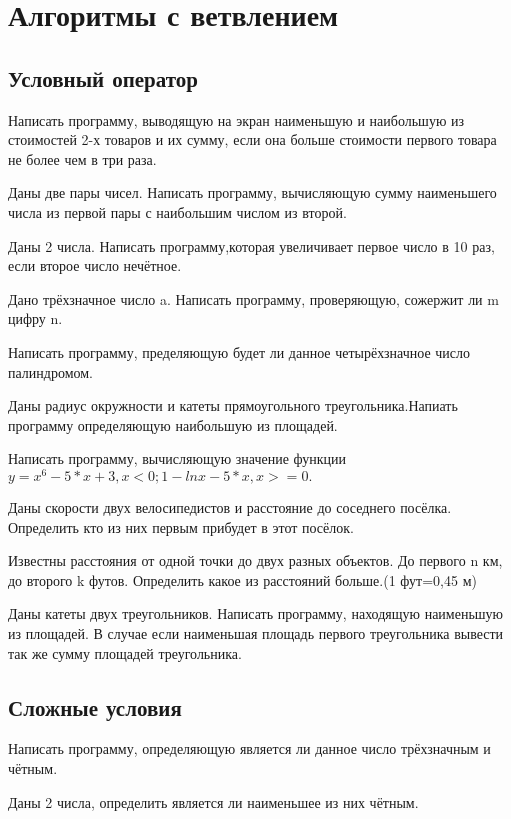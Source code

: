 \section{Алгоритмы с ветвлением}

\subsection{Условный оператор}

\task Написать программу, выводящую на экран наименьшую и наибольшую из стоимостей 2-х товаров и их сумму, если она больше стоимости первого товара не более чем в три раза.

\task Даны две пары чисел. Написать программу, вычисляющую сумму наименьшего числа из первой пары с наибольшим числом из второй.

\task Даны 2 числа. Написать программу,которая увеличивает первое число в 10 раз, если второе число нечётное.

\task Дано трёхзначное число a. Написать программу, проверяющую, сожержит ли m цифру n.

\task Написать программу, пределяющую будет ли данное четырёхзначное число палиндромом.

\task Даны радиус окружности и катеты прямоугольного треугольника.Напиать программу определяющую наибольшую из площадей.

\task Написать программу, вычисляющую значение функции $y= x^6-5*x+3, x<0;
1-lnx-5*x, x>=0.$

\task Даны скорости двух велосипедистов и расстояние до соседнего посёлка. Определить кто из них первым прибудет в этот посёлок.

\task Известны расстояния от одной точки до двух разных объектов. До первого n км, до второго k футов. Определить какое из расстояний больше.(1 фут=0,45 м)

\task Даны катеты двух треугольников. Написать программу, находящую наименьшую из площадей. В случае если наименьшая площадь первого треугольника вывести так же сумму площадей треугольника.

\subsection{Сложные условия}

\task Написать программу, определяющую является ли данное число трёхзначным и чётным.

\task Даны 2 числа, определить является ли наименьшее из них чётным.

